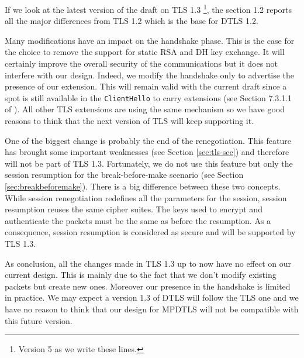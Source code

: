 If we look at the latest version of the draft on TLS 1.3 \cite{draft-tls13}\footnote{Version 5 as we write these lines.}, the section 1.2 reports all the major differences from TLS 1.2 which is the base for DTLS 1.2.

Many modifications have an impact on the handshake phase. This is the case for the choice to remove the support for static RSA and DH key exchange. It will certainly improve the overall security of the communications but it does not interfere with our design. Indeed, we modify the handshake only to advertise the presence of our extension. This will remain valid with the current draft since a spot is still available in the \texttt{ClientHello} to carry extensions (see Section 7.3.1.1 of \cite{draft-tls13}). All other TLS extensions are using the same mechanism so we have good reasons to think that the next version of TLS will keep supporting it.

One of the biggest change is probably the end of the renegotiation. This feature has brought some important weaknesses (see Section \ref{sec:tls-sec}) and therefore will not be part of TLS 1.3. Fortunately, we do not use this feature but only the session resumption for the break-before-make scenario (see Section \ref{sec:breakbeforemake}). There is a big difference between these two concepts. While session renegotiation redefines all the parameters for the session, session resumption reuses the same cipher suites. The keys used to encrypt and authenticate the packets must be the same as before the resumption. As a consequence, session resumption is considered as secure and will be supported by TLS 1.3.

As conclusion, all the changes made in TLS 1.3 up to now have no effect on our current design. This is mainly due to the fact that we don't modify existing packets but create new ones. Moreover our presence in the handshake is limited in practice. We may expect a version 1.3 of DTLS will follow the TLS one and we have no reason to think that our design for MPDTLS will not be compatible with this future version.